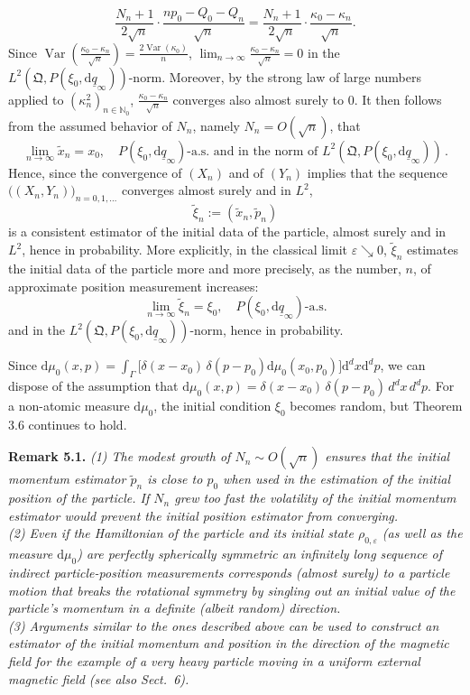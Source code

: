 \documentclass[11pt]{article}
\begin{document}
$$\frac{N_n+1}{2\sqrt{n}}\cdot \frac{np_0-Q_0-Q_n}{\sqrt{n}}=\frac{N_n+1}{2\sqrt{n}} \cdot \frac{\kappa_0-\kappa_n}{\sqrt{n}}.$$
Since $\operatorname{Var}(\frac{\kappa_0-\kappa_n}{\sqrt{n}})=\frac{2\operatorname{Var}(\kappa_0)}{n}$, 
$\lim_{n\to\infty}\frac{\kappa_0-\kappa_n}{\sqrt{n}}=0$ in the $L^2(\mathfrak{Q}, P(\xi_0,\text{d}\underline{q}_\infty))$-norm. 
Moreover, by the strong law of large numbers applied to $(\kappa_n^2)_{n\in \mathbb N_0}$, 
$\frac{\kappa_0-\kappa_n}{\sqrt{n}}$ converges also almost surely to $0$. It then follows from 
the assumed behavior of $N_n$, namely $N_n=O(\sqrt{n})$, that
$$\lim_{n\to\infty} \tilde x_n=x_0,\quad P(\xi_0,\text{d}\underline{q}_\infty)\mbox{-a.s. and in the norm of }
L^2(\mathfrak{Q}, P(\xi_0,\text{d}\underline{q}_\infty))\,.$$
Hence, since the convergence of $(X_n)$ and of $(Y_n)$ implies that the sequence 
$\big((X_n,Y_n)\big)_{n=0,1,\dots}$ converges almost surely and in $L^2$, 
$$\tilde\xi_n:=(\tilde x_n,\tilde p_n)$$
is a consistent estimator of the initial data of the particle, almost surely and in $L^2$, 
hence in probability. More explicitly, in the classical limit $\varepsilon\searrow 0$, $\tilde{\xi}_n$ estimates the 
initial data of the particle more and more precisely, as the number, $n$, of approximate position measurement increases:
$$\lim_{n\to\infty} \tilde \xi_n=\xi_0, \quad P(\xi_0,\text{d}\underline{q}_\infty)\mbox{-a.s.}$$
and in the $L^2(\mathfrak{Q}, P(\xi_0,\text{d}\underline{q}_\infty))$-norm, hence in probability.

Since $\text{d}\mu_0(x, p)=\int_\Gamma \big[\delta(x- x_0) \,\delta(p - p_0) \text{d}\mu_0(x_0, p_0)\big]\text{d}^dx\text{d}^dp$, we can dispose of the assumption that $\text{d}\mu_{0}(x, p)= \delta(x- x_0) \, \delta(p - p_0)\,d^{d}x \, d^{d}p.$
For a non-atomic measure $\text{d}\mu_0$, the initial condition $\xi_0$ becomes random, but Theorem 3.6 continues to hold. 

\medskip
\noindent
{\bf{Remark 5.1.}} \textit{(1) The modest growth of $N_n \sim O(\sqrt{n})$ ensures that the initial momentum estimator
$\tilde p_n$ is close to $p_0$ when used in the estimation of the initial position of the particle. If $N_n$ grew too fast the 
volatility of the initial momentum estimator would prevent the initial position estimator from converging.}\\
\textit{(2) Even if the Hamiltonian of the particle and its initial state $\rho_{0, \varepsilon}$ (as well as the measure 
$\text{d}\mu_0$) are perfectly spherically symmetric an infinitely long sequence of indirect particle-position measurements 
corresponds (almost surely) to a particle motion that breaks the rotational symmetry by singling out an initial value 
of the particle's momentum in a definite (albeit random) direction.}\\
\textit{(3) Arguments similar to the ones described above can be used to
construct an estimator of the initial momentum and position in the direction of the magnetic field 
for the example of a very heavy particle moving in a uniform external magnetic field (see also Sect.~6).}\\
\end{document}
